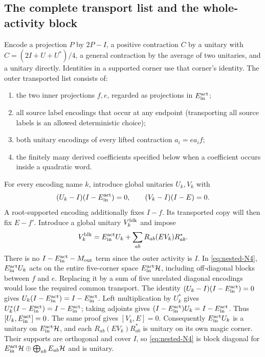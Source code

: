 \subsection{The complete transport list and the whole-activity block}
Encode a projection $P$ by $2P-I$, a positive contraction $C$ by a
unitary with $C=(2I+U+U^*)/4$, a general contraction by the average of
two unitaries, and a unitary directly. Identities in a supported corner
use that corner's identity. The outer transported list consists of:
\begin{enumerate}
\item the two inner projections $f,e$, regarded as projections in ${E^{\rm act}_{\rm in}}$;
\item all source label encodings that occur at any endpoint (transporting
all source labels is an allowed deterministic choice);
\item both unitary encodings of every lifted contraction $a_i=e a_i f$;
\item the finitely many derived coefficients specified below when a
coefficient occurs inside a quadratic word.
\end{enumerate}
For every encoding name $k$, introduce global unitaries $U_k,V_k$ with
\[
 (U_k-I)(I-{E^{\rm act}_{\rm in}})=0,\qquad (V_k-I)(I-E)=0.
\]
A root-supported encoding additionally fixes $I-f$. Its transported
copy will then fix $E-f'$. Introduce a global unitary ${V^{\rm blk}_k}$ and impose
\begin{equation}
 {V^{\rm blk}_k}={E^{\rm act}_{\rm in}} U_k+\sum_{ab}R_{ab}(E V_k)R_{ab}^*.                    \label{eq:nested-N4}
\end{equation}
There is no $I-{E^{\rm act}_{\rm in}}-M_{\rm out}$ term since the outer activity is $I$.
In \eqref{eq:nested-N4}, $E^{\rm act}_{\rm in}U_k$ acts on the entire five-corner space ${E^{\rm act}_{\rm in}}\mathcal H$, including
off-diagonal blocks between $f$ and $e$. Replacing it by a sum of five
unrelated diagonal encodings would lose the required common transport.
The identity $(U_k-I)(I-{E^{\rm act}_{\rm in}})=0$ gives $U_k(I-{E^{\rm act}_{\rm in}})=I-{E^{\rm act}_{\rm in}}$.
Left multiplication by $U_k^*$ gives $U_k^*(I-{E^{\rm act}_{\rm in}})=I-{E^{\rm act}_{\rm in}}$;
taking adjoints gives $(I-{E^{\rm act}_{\rm in}})U_k=I-{E^{\rm act}_{\rm in}}$. Thus $[U_k,{E^{\rm act}_{\rm in}}]=0$.
The same proof gives $[V_k,E]=0$. Consequently $E^{\rm act}_{\rm in}U_k$ is a
unitary on ${E^{\rm act}_{\rm in}}\mathcal H$, and each $R_{ab}(EV_k)R_{ab}^*$ is unitary
on its own magic corner. Their supports are orthogonal and cover $I$,
so \eqref{eq:nested-N4} is block diagonal for
${E^{\rm act}_{\rm in}}\mathcal H\oplus\bigoplus_{ab}E_{ab}\mathcal H$ and is unitary.

